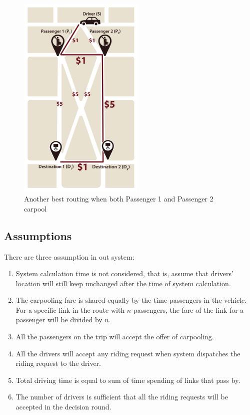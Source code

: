 \begin{figure}[htp]
  \centering
  \captionsetup{justification=centering}
  \includegraphics[width=6cm]{figures/mapV2_3.jpg}
  \caption{Another best routing when both Passenger 1 and Passenger 2 carpool}
\end{figure}
\newpage

\subsection{Assumptions}

There are three assumption in out system:

\begin{enumerate}
  \item System calculation time is not considered, that is, assume that drivers' location will still keep unchanged after the time of system calculation.
  \item The carpooling fare is shared equally by the time passengers in the vehicle. For a specific link in the route with $n$ passengers, the fare of the link for a passenger will be divided by $n$.
  \item All the passengers on the trip will accept the offer of carpooling.
  \item All the drivers will accept any riding request when system dispatches the riding request to the driver.
  \item Total driving time is equal to sum of time spending of links that pass by.
  \item The number of drivers is sufficient that all the riding requests will be accepted in the decision round.
 \end{enumerate}

